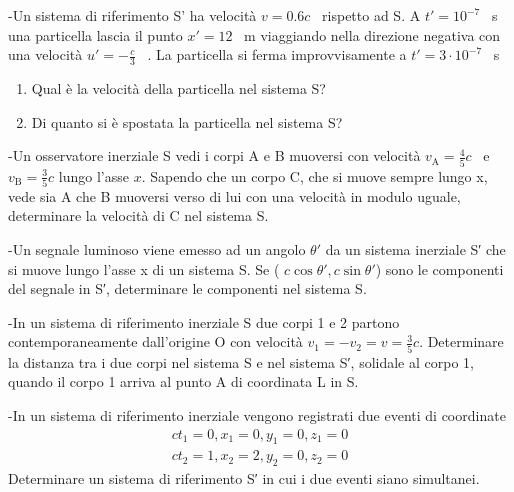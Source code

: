 \documentclass[12pt,twoside,a4]{article}
\begin{document}
\newpage
\begin{esercizio}
	-Un sistema di riferimento S' ha velocità $v=0.6c$ \ rispetto ad S. A $t' = 10^{-7} $ \ s una particella lascia il punto $x'= 12$ \ m viaggiando nella direzione negativa con una velocità $u'= - \frac{c}{3}$ \ . La particella si ferma improvvisamente a $t'=3\cdot 10^{-7}$ \ s 
\begin{enumerate}[label=(\textit{\roman*})]
		\item Qual è la velocità della particella nel sistema S?
		\item Di quanto si è spostata la particella nel sistema S?
	\end{enumerate}
 
\end{esercizio}


\begin{esercizio}
	-Un osservatore inerziale S vedi i corpi A e B muoversi con velocità  $v_{\mathrm{A}}=\frac{4}{5}c$ \ e \ $v_{\mathrm{B}}=\frac{3}{5}c$ lungo l'asse $x$. Sapendo che un corpo C, che si muove sempre lungo x, vede sia A che B muoversi verso di lui con una velocità  in modulo uguale, determinare la velocità  di C nel sistema S.
\end{esercizio}

\begin{esercizio}
	-Un segnale luminoso viene emesso ad un angolo $\theta '$ da un sistema inerziale S′ che si muove lungo l'asse x di un sistema S. Se ( $c \cos \theta', c \sin \theta '$) sono le componenti del segnale in S′, determinare le componenti nel sistema S.
\end{esercizio}

\begin{esercizio}
	-In un sistema di riferimento inerziale S due corpi 1 e 2 partono contemporaneamente dall'origine O con velocità  $v_1=-v_2=v=\frac{3}{5}c$. Determinare la distanza tra i due corpi nel sistema S e nel sistema S′, solidale al corpo 1, quando il corpo 1 arriva al punto A di coordinata L in S.
\end{esercizio}

\begin{esercizio}
	-In un sistema di riferimento inerziale vengono registrati due eventi di coordinate
	\begin{gather*} 
		ct_1=0 , x_1=0, y_1=0, z_1=0 \\
		ct_2=1 , x_2=2, y_2=0, z_2=0 
	\end{gather*}
	Determinare un sistema di riferimento S′ in cui i due eventi siano simultanei.
\end{esercizio}
\end{document}
